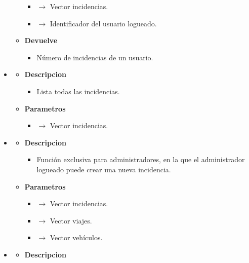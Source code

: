 \begin{itemize}
\begin{itemize}
\begin{itemize}
			\item {} $\rightarrow$ Vector incidencias.
            \item {} $\rightarrow$ Identificador del usuario logueado.
		\end{itemize}
        \item \textbf{Devuelve}
		\begin{itemize}
			\item Número de incidencias de un usuario.
		\end{itemize}
	\end{itemize}
    \item{}
	\begin{itemize}
		\item \textbf{Descripcion}
        \begin{itemize}
			\item Lista todas las incidencias.
		\end{itemize}
        \item \textbf{Parametros}
		\begin{itemize}
			\item {} $\rightarrow$ Vector incidencias.
		\end{itemize}
	\end{itemize}
	\item{}
	\begin{itemize}
		\item \textbf{Descripcion}
        \begin{itemize}
			\item Función exclusiva para administradores, en la que el administrador logueado puede crear una nueva incidencia.
		\end{itemize}
        \item \textbf{Parametros}
		\begin{itemize}
			\item {} $\rightarrow$ Vector incidencias.
            \item {} $\rightarrow$ Vector viajes.
            \item {} $\rightarrow$ Vector vehículos.
		\end{itemize}
	\end{itemize}
    \item{}
	\begin{itemize}
		\item \textbf{Descripcion}

\end{itemize}
\end{itemize}
